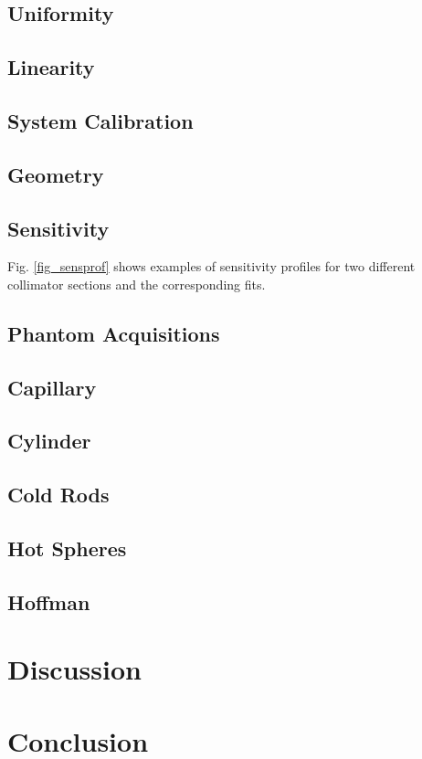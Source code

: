 \subsection{Uniformity}
\subsection{Linearity} 
\subsection{System Calibration}
\subsection{Geometry}
\subsection{Sensitivity}
Fig. \ref{fig_sensprof} shows examples of sensitivity profiles for two different collimator sections and the corresponding fits.
\subsection{Phantom Acquisitions}
\subsection{Capillary}
\subsection{Cylinder}
\subsection{Cold Rods}
\subsection{Hot Spheres} 
\subsection{Hoffman}

\section{Discussion}

\section{Conclusion}